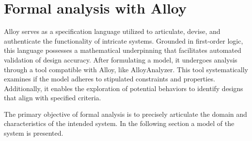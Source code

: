 \documentclass[12pt, a4paper]{report}
\begin{document}
\chapter{Formal analysis with Alloy}
    Alloy serves as a specification language utilized to articulate, devise, and authenticate the functionality of intricate systems. 
    Grounded in first-order logic, this language possesses a mathematical underpinning that facilitates automated validation of design accuracy.
    After formulating a model, it undergoes analysis through a tool compatible with Alloy, like AlloyAnalyzer.
    This tool systematically examines if the model adheres to stipulated constraints and properties.
    Additionally, it enables the exploration of potential behaviors to identify designs that align with specified criteria.

    The primary objective of formal analysis is to precisely articulate the domain and characteristics of the intended system.
    In the following section a model of the system is presented.
\end{document}
